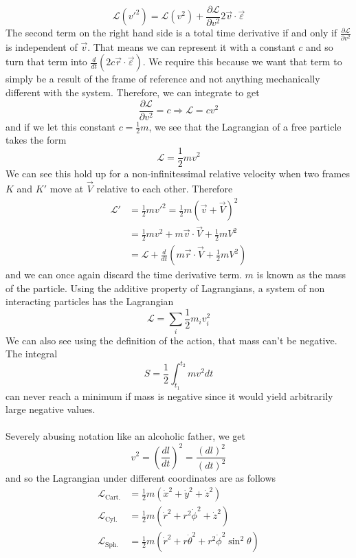 \documentclass{article}
\newcommand{\pd}[2]{\frac{\partial #1}{\partial #2}}
\newcommand{\od}[2]{\frac{d #1}{d #2}}
\newcommand{\lagr}{\mathscr{L}}
\theoremstyle{definition}
\theoremstyle{remark}
\begin{document}
\begin{equation*}
    \lagr (v'^2) = \lagr(v^2) + \pd{\lagr}{v^2} 2\vec v\cdot \vec \varepsilon
\end{equation*}
The second term on the right hand side is a total time derivative if and only if $\pd{\lagr}{v^2}$ is independent of $\vec v$. That means we can represent it with a constant $c$ and so turn that term into $\od{}{t}(2c\vec r \cdot \vec \varepsilon)$. We require this because we want that term to simply be a result of the frame of reference and not anything mechanically different with the system. Therefore, we can integrate to get 
\begin{equation*}
    \pd{\lagr}{v^2} = c \Rightarrow \lagr = cv^2
\end{equation*}
and if we let this constant $c=\frac{1}{2}m$, we see that the Lagrangian of a free particle takes the form 
\begin{equation}
    \lagr = \frac{1}{2}mv^2
\end{equation}
We can see this hold up for a non-infinitessimal relative velocity when two frames $K$ and $K'$ move at $\vec V$ relative to each other. Therefore 
\begin{equation*}
    \begin{split}
        \lagr ' &= \frac{1}{2}mv'^2 = \frac{1}{2}m(\vec v+\vec V)^2 \\&= \frac{1}{2}mv^2 + m\vec v\cdot \vec V + \frac{1}{2}mV^2 \\
        &= \lagr + \od{}{t}\left(m\vec r \cdot \vec V + \frac{1}{2} mV^2\right)
    \end{split}
\end{equation*}
and we can once again discard the time derivative term. $m$ is known as the mass of the particle. Using the additive property of Lagrangians, a system of non interacting particles has the Lagrangian 
\begin{equation*}
    \lagr = \sum_i \frac{1}{2}m_iv_i^2
\end{equation*}
We can also see using the definition of the action, that mass can't be negative. The integral 
\begin{equation*}
    S= \frac{1}{2}\int^{t_2}_{t_1}mv^2dt
\end{equation*}
can never reach a minimum if mass is negative since it would yield arbitrarily large negative values.\\\\
Severely abusing notation like an alcoholic father, we get 
\begin{equation*}
    v^2 = \left( \od{l}{t}\right)^2 = \frac{(dl)^2}{(dt)^2}
\end{equation*}
and so the Lagrangian under different coordinates are as follows 
\begin{equation*}
    \begin{split}
        \lagr_{\text{Cart.}} & = \frac{1}{2}m(\dot x^2+\dot y^2+\dot z^2) \\
        \lagr_{\text{Cyl.}}&= \frac{1}{2}m(\dot r^2 + r^2 \dot \phi^2 + \dot z^2) \\
        \lagr_{\text{Sph.}}&=\frac{1}{2}m(\dot r^2+r\dot \theta^2 + r^2 \dot \phi ^2\sin^2 \theta)
    \end{split}
\end{equation*}
\end{document}
